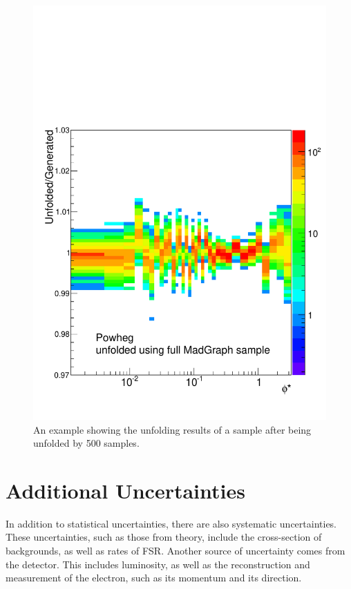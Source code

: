 \begin{figure}
    \centering
    \includegraphics[width=\textwidth]{figures/Unfolding/BM_2D_PM_FULL.pdf}
    \caption{An example showing the unfolding results of a \POWHEG sample after being unfolded by 500 \MADGRAPH samples.}
    \label{fig:UnfoldMonte CarloStatErrorExample}
\end{figure}



\section{Additional Uncertainties}
In addition to statistical uncertainties, there are also systematic uncertainties. These uncertainties, such as those from theory, include the cross-section of backgrounds, as well as rates of FSR. Another source of uncertainty comes from the detector. This includes luminosity, as well as the reconstruction and measurement of the electron, such as its momentum and its direction.
